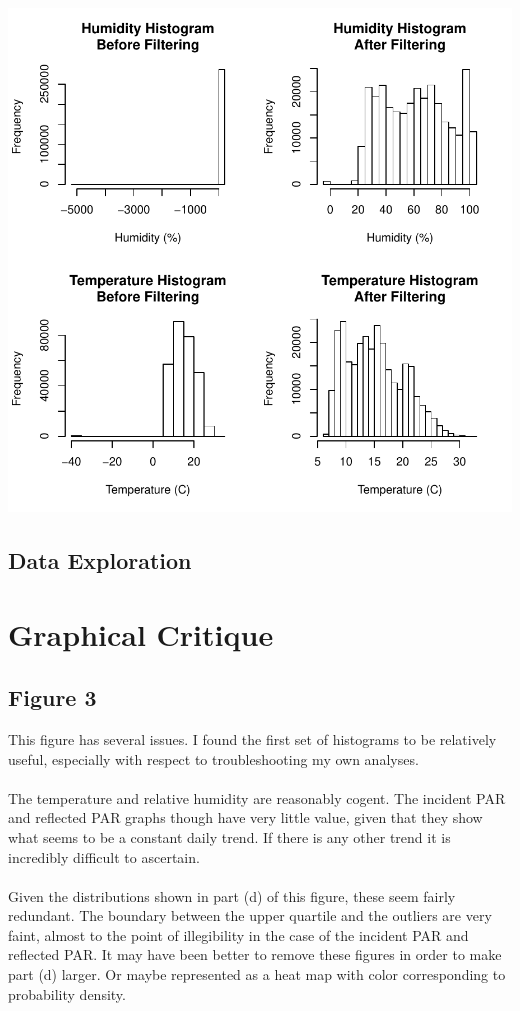 \documentclass[english]{article}\usepackage[]{graphicx}\usepackage[]{color}
\makeatletter
\def\maxwidth{ %
  \ifdim\Gin@nat@width>\linewidth
    \linewidth
  \else
    \Gin@nat@width
  \fi
}
\newenvironment{knitrout}{}{} %
\makeatother
\begin{document}
\begin{knitrout}
\color{fgcolor}

{\centering \includegraphics[width=\maxwidth]{figure/load-data-1} 

}



\end{knitrout}

\subsection{Data Exploration}

\section{Graphical Critique}

\subsection{Figure 3}

This figure has several issues.  I found the first set of histograms to be relatively
useful, especially with respect to troubleshooting my own analyses.\\\\
The temperature and relative humidity are reasonably cogent.  The incident PAR and 
reflected PAR graphs though have very little value, given that they show
what seems to be a constant daily trend.  If there is any other trend it is
incredibly difficult to ascertain.\\\\
Given the distributions shown in part (d) of this figure, these seem fairly redundant.
The boundary between the upper quartile and the outliers are very faint, almost to the
point of illegibility in the case of the incident PAR and reflected PAR.  It may have
been better to remove these figures in order to make part (d) larger.  Or maybe represented
as a heat map with color corresponding to probability density.
\end{document}
